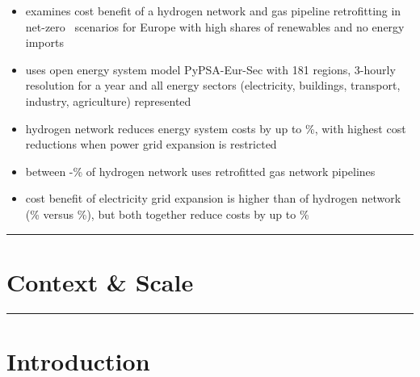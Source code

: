 \documentclass[12pt,preprint]{elsarticle}
\newcommand{\co}{\ce{CO2}~}
\begin{document}

\begin{itemize}
	\item examines cost benefit of a hydrogen network and gas pipeline retrofitting in net-zero \co scenarios for Europe with high shares of renewables and no energy imports
	\item uses open energy system model PyPSA-Eur-Sec with 181 regions, 3-hourly resolution for a year and all energy sectors (electricity, buildings, transport, industry, agriculture) represented
	\item hydrogen network reduces energy system costs by up to \maxhybenefitrel\%, with highest cost reductions when power grid expansion is restricted
	\item between \minretroshare-\maxretroshare\% of hydrogen network uses retrofitted gas network pipelines
	\item cost benefit of electricity grid expansion is higher than of hydrogen network (\maxacbenefitrel\% versus \maxhybenefitrel\%), but both together reduce costs by up to \gridbenefitrel\%
\end{itemize}

\par\noindent\rule{\textwidth}{0.4pt}

\section*{Context \& Scale}



\par\noindent\rule{\textwidth}{0.4pt}





\section*{Introduction}
\label{sec:intro}
\end{document}
